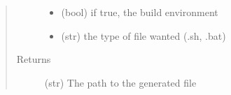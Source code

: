 \documentclass[a4paper,10pt,english]{sphinxmanual}
\begin{document}
\begin{fulllineitems}
\begin{fulllineitems}
\begin{quote}
\begin{description}
\begin{itemize}
\item {} 
 \textendash{} (bool) if true, the build environment

\item {} 
 \textendash{} (str) the type of file wanted (.sh, .bat)

\end{itemize}

\item[{Returns}] \leavevmode
(str) The path to the generated file

\end{description}\end{quote}

\end{fulllineitems}


\end{fulllineitems}

\end{document}
